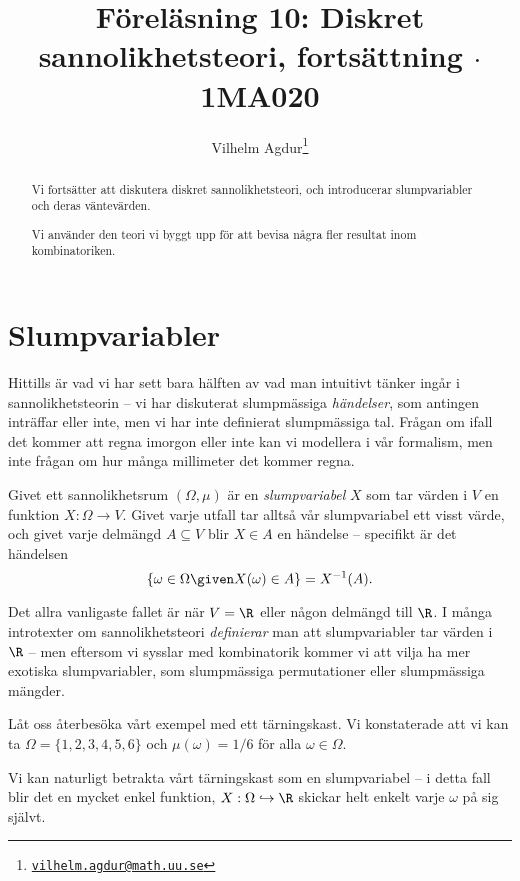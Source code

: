 \documentclass[nobib]{tufte-handout}
\title{Föreläsning 10: Diskret sannolikhetsteori, fortsättning $\cdot$ 1MA020}
\author[Vilhelm Agdur]{Vilhelm Agdur\thanks{\href{mailto:vilhelm.agdur@math.uu.se}{\nolinkurl{vilhelm.agdur@math.uu.se}}}}
\begin{document}

\maketitle%

\begin{abstract}
\noindent
Vi fortsätter att diskutera diskret sannolikhetsteori, och introducerar slumpvariabler och deras väntevärden.

Vi använder den teori vi byggt upp för att bevisa några fler resultat inom kombinatoriken.
\end{abstract}

\section{Slumpvariabler}

Hittills är vad vi har sett bara hälften av vad man intuitivt tänker ingår i sannolikhetsteorin -- vi har diskuterat slumpmässiga \emph{händelser}, som antingen inträffar eller inte, men vi har inte definierat slumpmässiga tal. Frågan om ifall det kommer att regna imorgon eller inte kan vi modellera i vår formalism, men inte frågan om hur många millimeter det kommer regna.

\begin{definition}
    Givet ett sannolikhetsrum $(\Omega, \mu)$ är en \emph{slumpvariabel} $X$ som tar värden i $V$ en funktion $X: \Omega \to V$. Givet varje utfall tar alltså vår slumpvariabel ett visst värde, och givet varje delmängd $A\subseteq V$ blir $X\in A$ en händelse -- specifikt är det händelsen
    $$\left\{\omega \in \Omega \given X(\omega) \in A\right\} = X^{-1}(A).$$
\end{definition}

Det allra vanligaste fallet är när $V = \R$ eller någon delmängd till $\R$. I många introtexter om sannolikhetsteori \emph{definierar} man att slumpvariabler tar värden i $\R$ -- men eftersom vi sysslar med kombinatorik kommer vi att vilja ha mer exotiska slumpvariabler, som slumpmässiga permutationer eller slumpmässiga mängder.

\begin{example}
    Låt oss återbesöka vårt exempel med ett tärningskast. Vi konstaterade att vi kan ta $\Omega = \{1,2,3,4,5,6\}$ och $\mu(\omega) = 1/6$ för alla $\omega \in \Omega$.

    Vi kan naturligt betrakta vårt tärningskast som en slumpvariabel -- i detta fall blir det en mycket enkel funktion, $X: \Omega \hookrightarrow \R$ skickar helt enkelt varje $\omega$ på sig självt.
\end{example}
\end{document}
